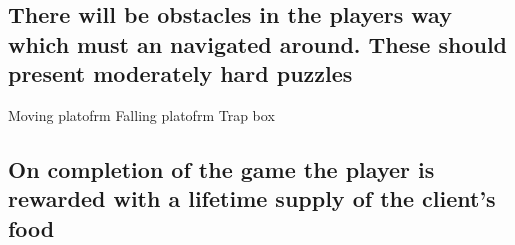 \documentclass{article}
\begin{document}
\subsection{ There will be obstacles in the players way which must an navigated around. These should present moderately hard puzzles }
Moving platofrm
Falling platofrm
Trap box

\subsection{ On completion of the game the player is rewarded with a lifetime supply of the client's food }



\end{document}
